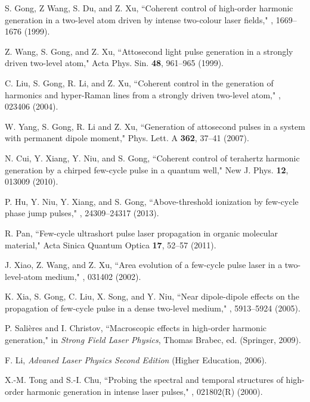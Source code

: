 \documentclass[10pt,letterpaper]{article}
\begin{document}
\begin{thebibliography}{99}
S. Gong, Z Wang, S. Du, and Z. Xu, ``Coherent control of high-order harmonic generation in a two-level atom driven by intense two-colour laser fields," , 1669--1676 (1999).

Z. Wang, S. Gong, and Z. Xu, ``Attosecond light pulse generation in a strongly driven two-level atom," Acta Phys. Sin. {\bf 48}, 961--965 (1999).

C. Liu, S. Gong, R. Li, and Z. Xu, ``Coherent control in the generation of harmonics and hyper-Raman lines from a strongly driven two-level atom," , 023406 (2004).

W. Yang, S. Gong, R. Li and Z. Xu, ``Generation of attosecond pulses in a system with permanent dipole moment," Phys. Lett. A {\bf 362}, 37--41 (2007).

N. Cui, Y. Xiang, Y. Niu, and S. Gong, ``Coherent control of terahertz harmonic generation by a chirped few-cycle pulse in a quantum well," New J. Phys. {\bf 12}, 013009 (2010).

P. Hu, Y. Niu, Y. Xiang, and S. Gong, ``Above-threshold ionization by few-cycle phase jump pulses," , 24309--24317 (2013).

R. Pan, ``Few-cycle ultrashort pulse laser propagation in organic molecular material," Acta Sinica Quantum Optica {\bf 17}, 52--57 (2011).

J. Xiao, Z. Wang, and Z. Xu, ``Area evolution of a few-cycle pulse laser in a two-level-atom medium," , 031402 (2002).

K. Xia, S. Gong, C. Liu, X. Song, and Y. Niu, ``Near dipole-dipole effects on the propagation of few-cycle pulse in a dense two-level medium," , 5913--5924 (2005).


P. Sali\`{e}res and I. Christov, ``Macroscopic effects in high-order harmonic
generation," in \emph{Strong Field Laser Physics}, Thomas Brabec, ed. (Springer, 2009).

F. Li, \emph{Advaned Laser Physics Second Edition} (Higher Education, 2006).

X.-M. Tong and S.-I. Chu, ``Probing the spectral and temporal structures of high-order harmonic generation in intense laser pulses," , 021802(R) (2000).


\end{thebibliography}
\end{document}

